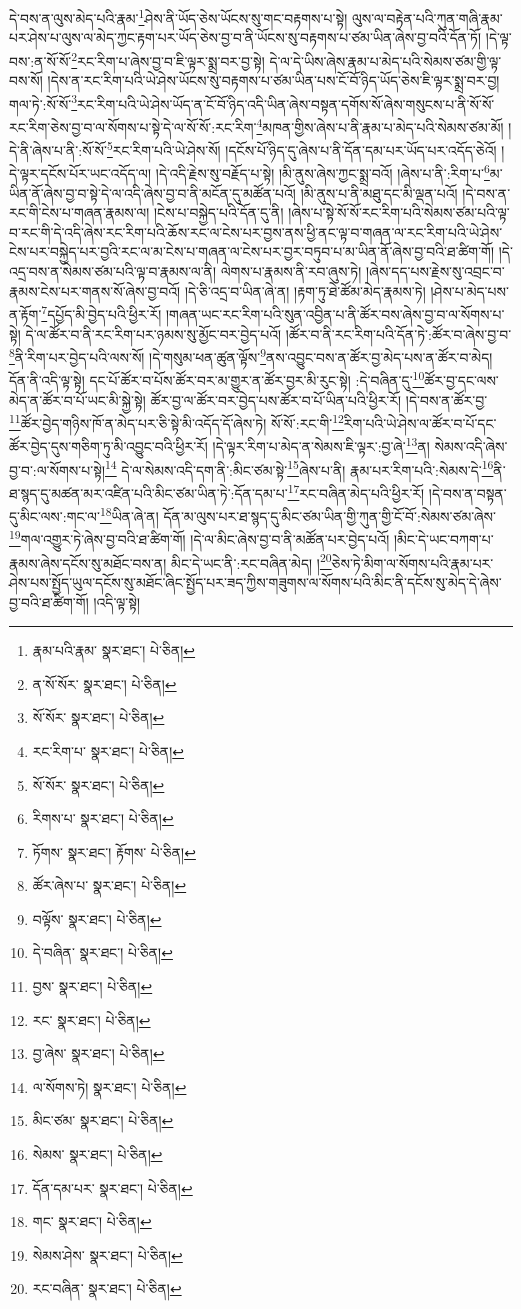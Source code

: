 དེ་བས་ན་ལུས་མེད་པའི་རྣམ་\footnote{རྣམ་པའི་རྣམ་  སྣར་ཐང་།  པེ་ཅིན། }ཤེས་ནི་ཡོད་ཅེས་ཡོངས་སུ་གང་བརྟགས་པ་སྟེ། ལུས་ལ་བརྟེན་པའི་ཀུན་གཞི་རྣམ་པར་ཤེས་པ་ལུས་ལ་མེད་ཀྱང་རྟག་པར་ཡོད་ཅེས་བྱ་བ་ནི་ཡོངས་སུ་བརྟགས་པ་ཙམ་ཡིན་ཞེས་བྱ་བའི་དོན་ཏོ། །དེ་ལྟ་བས་:ན་སོ་སོ་\footnote{ན་སོ་སོར་  སྣར་ཐང་།  པེ་ཅིན། }རང་རིག་པ་ཞེས་བྱ་བ་ཇི་ལྟར་སྨྲ་བར་བྱ་སྟེ། དེ་ལ་དེ་ཡིས་ཞེས་རྣམ་པ་མེད་པའི་སེམས་ཙམ་གྱི་ལྟ་བས་སོ། །དེས་ན་རང་རིག་པའི་ཡེ་ཤེས་ཡོངས་སུ་བརྟགས་པ་ཙམ་ཡིན་པས་ངོ་བོ་ཉིད་ཡོད་ཅེས་ཇི་ལྟར་སྨྲ་བར་བྱ། གལ་ཏེ་:སོ་སོ་\footnote{སོ་སོར་  སྣར་ཐང་།  པེ་ཅིན། }རང་རིག་པའི་ཡེ་ཤེས་ཡོད་ན་ངོ་བོ་ཉིད་འདི་ཡིན་ཞེས་བསྟན་དགོས་སོ་ཞེས་གསུངས་པ་ནི་སོ་སོ་རང་རིག་ཅེས་བྱ་བ་ལ་སོགས་པ་སྟེ་དེ་ལ་སོ་སོ་:རང་རིག་\footnote{རང་རིག་པ་  སྣར་ཐང་།  པེ་ཅིན། }མཁན་གྱིས་ཞེས་པ་ནི་རྣམ་པ་མེད་པའི་སེམས་ཙམ་མོ། །དེ་ནི་ཞེས་པ་ནི་:སོ་སོ་\footnote{སོ་སོར་  སྣར་ཐང་།  པེ་ཅིན། }རང་རིག་པའི་ཡེ་ཤེས་སོ། །དངོས་པོ་ཉིད་དུ་ཞེས་པ་ནི་དོན་དམ་པར་ཡོད་པར་འདོད་ཅེའོ། །དེ་ལྟར་དངོས་པོར་ཡང་འདོད་ལ། །དེ་འདི་རྗེས་སུ་བརྗོད་པ་སྟེ། །མི་ནུས་ཞེས་ཀྱང་སྨྲ་བའོ། །ཞེས་པ་ནི་:རིག་པ་\footnote{རིགས་པ་  སྣར་ཐང་།  པེ་ཅིན། }མ་ཡིན་ནོ་ཞེས་བྱ་བ་སྟེ་དེ་ལ་འདི་ཞེས་བྱ་བ་ནི་མངོན་དུ་མཚོན་པའོ། །མི་ནུས་པ་ནི་མཐུ་དང་མི་ལྡན་པའོ། །དེ་བས་ན་རང་གི་ངེས་པ་གཞན་རྣམས་ལ། །ངེས་པ་བསྐྱེད་པའི་དོན་དུ་ནི། །ཞེས་པ་སྟེ་སོ་སོ་རང་རིག་པའི་སེམས་ཙམ་པའི་ལྟ་བ་རང་གི་དེ་འདི་ཞེས་རང་རིག་པའི་ཆོས་རང་ལ་ངེས་པར་བྱས་ནས་ཕྱི་ནང་ལྟ་བ་གཞན་ལ་རང་རིག་པའི་ཡེ་ཤེས་ངེས་པར་བསྐྱེད་པར་བྱའི་རང་ལ་མ་ངེས་པ་གཞན་ལ་ངེས་པར་བྱར་བཏུབ་པ་མ་ཡིན་ནོ་ཞེས་བྱ་བའི་ཐ་ཚིག་གོ། །དེ་འདྲ་བས་ན་སེམས་ཙམ་པའི་ལྟ་བ་རྣམས་ལ་ནི། ལེགས་པ་རྣམས་ནི་རབ་ཞུས་ཏེ། །ཞེས་དད་པས་རྗེས་སུ་འབྲང་བ་རྣམས་ངེས་པར་གནས་སོ་ཞེས་བྱ་བའོ། །དེ་ཅི་འདྲ་བ་ཡིན་ཞེ་ན། །རྟག་ཏུ་ཐེ་ཚོམ་མེད་རྣམས་ཏེ། །ཤེས་པ་མེད་པས་ན་རྟོག་\footnote{ཏོགས་  སྣར་ཐང་། རྟོགས་  པེ་ཅིན། }དཔྱོད་མི་བྱེད་པའི་ཕྱིར་རོ། །གཞན་ཡང་རང་རིག་པའི་སུན་འབྱིན་པ་ནི་ཚོར་བས་ཞེས་བྱ་བ་ལ་སོགས་པ་སྟེ། དེ་ལ་ཚོར་བ་ནི་རང་རིག་པར་ཉམས་སུ་མྱོང་བར་བྱེད་པའོ། །ཚོར་བ་ནི་རང་རིག་པའི་དོན་ཏེ་:ཚོར་བ་ཞེས་བྱ་བ་\footnote{ཚོར་ཞེས་པ་  སྣར་ཐང་།  པེ་ཅིན། }ནི་རིག་པར་བྱེད་པའི་ལས་སོ། །དེ་གསུམ་ཕན་ཚུན་ལྟོས་\footnote{བལྟོས་  སྣར་ཐང་།  པེ་ཅིན། }ནས་འབྱུང་བས་ན་ཚོར་བྱ་མེད་པས་ན་ཚོར་བ་མེད། དོན་ནི་འདི་ལྟ་སྟེ། དང་པོ་ཚོར་བ་པོས་ཚོར་བར་མ་གྱུར་ན་ཚོར་བྱར་མི་རུང་སྟེ། :དེ་བཞིན་དུ་\footnote{དེ་བཞིན་  སྣར་ཐང་།  པེ་ཅིན། }ཚོར་བྱ་དང་ལས་མེད་ན་ཚོར་བ་པོ་ཡང་མི་སྐྱེ་སྟེ། ཚོར་བྱ་ལ་ཚོར་བར་བྱེད་པས་ཚོར་བ་པོ་ཡིན་པའི་ཕྱིར་རོ། །དེ་བས་ན་ཚོར་བྱ་\footnote{བྱས་  སྣར་ཐང་།  པེ་ཅིན། }ཚོར་བྱེད་གཉིས་ཁོ་ན་མེད་པར་ཅི་སྟེ་མི་འདོད་དོ་ཞེས་ཏེ། སོ་སོ་:རང་གི་\footnote{རང་  སྣར་ཐང་།  པེ་ཅིན། }རིག་པའི་ཡེ་ཤེས་ལ་ཚོར་བ་པོ་དང་ཚོར་བྱེད་དུས་གཅིག་ཏུ་མི་འབྱུང་བའི་ཕྱིར་རོ། །དེ་ལྟར་རིག་པ་མེད་ན་སེམས་ཇི་ལྟར་:བྱ་ཞེ་\footnote{བྱ་ཞེས་  སྣར་ཐང་།  པེ་ཅིན། }ན། སེམས་འདི་ཞེས་བྱ་བ་:ལ་སོགས་པ་སྟེ།\footnote{ལ་སོགས་ཏེ།  སྣར་ཐང་།  པེ་ཅིན། } དེ་ལ་སེམས་འདི་དག་ནི་:མིང་ཙམ་སྟེ་\footnote{མིང་ཙམ་  སྣར་ཐང་།  པེ་ཅིན། }ཞེས་པ་ནི། རྣམ་པར་རིག་པའི་:སེམས་དེ་\footnote{སེམས་  སྣར་ཐང་།  པེ་ཅིན། }ནི་ཐ་སྙད་དུ་མཚན་མར་འཛིན་པའི་མིང་ཙམ་ཡིན་ཏེ་:དོན་དམ་པ་\footnote{དོན་དམ་པར་  སྣར་ཐང་།  པེ་ཅིན། }རང་བཞིན་མེད་པའི་ཕྱིར་རོ། །དེ་བས་ན་བསྟན་དུ་མིང་ལས་:གང་ལ་\footnote{གང་  སྣར་ཐང་།  པེ་ཅིན། }ཡིན་ཞེ་ན། དོན་མ་ལུས་པར་ཐ་སྙད་དུ་མིང་ཙམ་ཡིན་གྱི་ཀུན་གྱི་ངོ་བོ་:སེམས་ཙམ་ཞེས་\footnote{སེམས་ཤེས་  སྣར་ཐང་།  པེ་ཅིན། }གལ་འགྱུར་ཏེ་ཞེས་བྱ་བའི་ཐ་ཚིག་གོ། །དེ་ལ་མིང་ཞེས་བྱ་བ་ནི་མཚོན་པར་བྱེད་པའོ། །མིང་དེ་ཡང་བཀག་པ་རྣམས་ཞེས་དངོས་སུ་མཐོང་བས་ན། མིང་དེ་ཡང་ནི་:རང་བཞིན་མེད། །\footnote{རང་བཞིན་  སྣར་ཐང་།  པེ་ཅིན། }ཅེས་ཏེ་མིག་ལ་སོགས་པའི་རྣམ་པར་ཤེས་པས་སྤྱོད་ཡུལ་དངོས་སུ་མཐོང་ཞིང་སྤྱོད་པར་ཟད་ཀྱིས་གཟུགས་ལ་སོགས་པའི་མིང་ནི་དངོས་སུ་མེད་དེ་ཞེས་བྱ་བའི་ཐ་ཚིག་གོ། །འདི་ལྟ་སྟེ། 